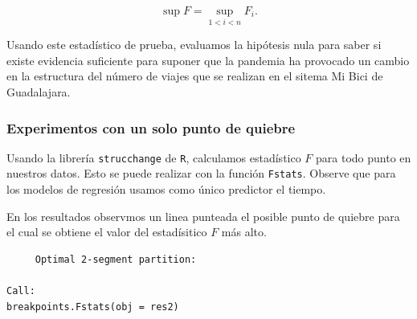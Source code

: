 \documentclass[
]{article}
\newenvironment{Shaded}{}{}
\newcommand{\AttributeTok}[1]{\textcolor[rgb]{0.49,0.56,0.16}{#1}}
\newcommand{\CommentTok}[1]{\textcolor[rgb]{0.38,0.63,0.69}{\textit{#1}}}
\newcommand{\DecValTok}[1]{\textcolor[rgb]{0.25,0.63,0.44}{#1}}
\newcommand{\FunctionTok}[1]{\textcolor[rgb]{0.02,0.16,0.49}{#1}}
\newcommand{\NormalTok}[1]{#1}
\newcommand{\OtherTok}[1]{\textcolor[rgb]{0.00,0.44,0.13}{#1}}
\newcommand{\SpecialCharTok}[1]{\textcolor[rgb]{0.25,0.44,0.63}{#1}}
\newcommand{\StringTok}[1]{\textcolor[rgb]{0.25,0.44,0.63}{#1}}
\begin{document}
\[\sup F = \sup_{1< i <n} F_i.\]

Usando este estadístico de prueba, evaluamos la hipótesis nula para
saber si existe evidencia suficiente para suponer que la pandemia ha
provocado un cambio en la estructura del número de viajes que se
realizan en el sitema Mi Bici de Guadalajara.

\newpage
\hypertarget{experimentos-con-un-solo-punto-de-quiebre}{%
\subsubsection{Experimentos con un solo punto de
quiebre}\label{experimentos-con-un-solo-punto-de-quiebre}}

Usando la librería \texttt{strucchange} de \texttt{R}, calculamos
estadístico \(F\) para todo punto en nuestros datos. Esto se puede
realizar con la función \texttt{Fstats}. Observe que para los modelos de
regresión usamos como único predictor el tiempo.

\begin{Shaded}
\end{Shaded}

En los resultados observmos un linea punteada el posible punto de
quiebre para el cual se obtiene el valor del estadísitico \(F\) más
alto.

\begin{verbatim}
	 Optimal 2-segment partition:

Call:
breakpoints.Fstats(obj = res2)
\end{verbatim}
\end{document}
